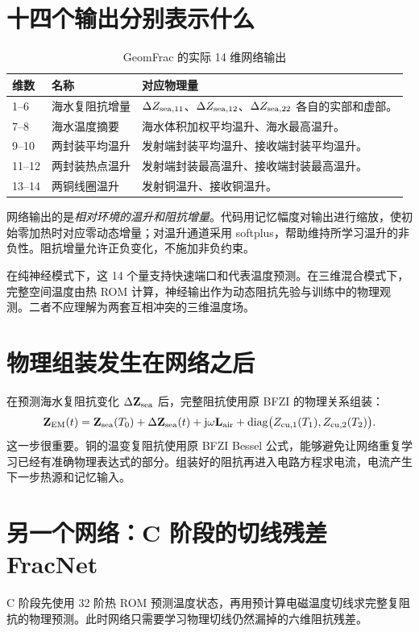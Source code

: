 \section{十四个输出分别表示什么}
\label{sec:output14}
\begin{table}[htbp]\centering\small
\caption{GeomFrac 的实际 14 维网络输出}
\begin{tabularx}{\textwidth}{p{1.4cm}p{3.5cm}X}
\toprule
维数 & 名称 & 对应物理量 \\
\midrule
1--6 & 海水复阻抗增量 & $\Delta Z_{\rm sea,11}$、$\Delta Z_{\rm sea,12}$、$\Delta Z_{\rm sea,22}$ 各自的实部和虚部。\\
7--8 & 海水温度摘要 & 海水体积加权平均温升、海水最高温升。\\
9--10 & 两封装平均温升 & 发射端封装平均温升、接收端封装平均温升。\\
11--12 & 两封装热点温升 & 发射端封装最高温升、接收端封装最高温升。\\
13--14 & 两铜线圈温升 & 发射铜温升、接收铜温升。\\
\bottomrule
\end{tabularx}
\end{table}

网络输出的是\emph{相对环境的温升和阻抗增量}。代码用记忆幅度对输出进行缩放，使初始零加热时对应零动态增量；对温升通道采用 softplus，帮助维持所学习温升的非负性。阻抗增量允许正负变化，不施加非负约束。

在纯神经模式下，这 14 个量支持快速端口和代表温度预测。在三维混合模式下，完整空间温度由热 ROM 计算，神经输出作为动态阻抗先验与训练中的物理观测。二者不应理解为两套互相冲突的三维温度场。

\section{物理组装发生在网络之后}
在预测海水复阻抗变化 $\Delta\mathbf Z_{\mathrm{sea}}$ 后，完整阻抗使用原 BFZI 的物理关系组装：
\[
\mathbf Z_{\mathrm{EM}}(t)=\mathbf Z_{\mathrm{sea}}(T_0)+\Delta\mathbf Z_{\mathrm{sea}}(t)
+\mathrm j\omega \mathbf L_{\rm air}
+\operatorname{diag}\bigl(Z_{{\rm cu},1}(T_1),Z_{{\rm cu},2}(T_2)\bigr).
\]
这一步很重要。铜的温变复阻抗使用原 BFZI Bessel 公式，能够避免让网络重复学习已经有准确物理表达式的部分。组装好的阻抗再进入电路方程求电流，电流产生下一步热源和记忆输入。

\section{另一个网络：C 阶段的切线残差 FracNet}
C 阶段先使用 32 阶热 ROM 预测温度状态，再用预计算电磁温度切线求完整复阻抗的物理预测。此时网络只需要学习物理切线仍然漏掉的六维阻抗残差。

